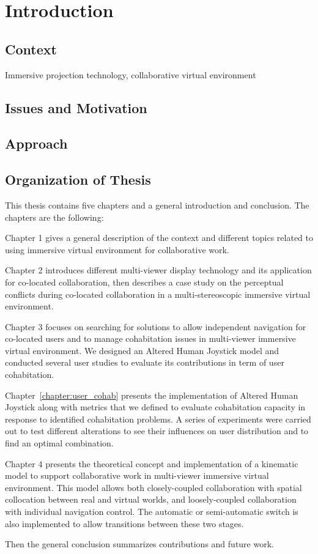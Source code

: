 \chapter*{Introduction}
\mtcaddchapter[Introduction]

\section*{Context}
Immersive projection technology, collaborative virtual environment

\section*{Issues and Motivation}

\section*{Approach}

\section*{Organization of Thesis}
This thesis contains five chapters and a general introduction and conclusion. The chapters are the following:

Chapter 1 gives a general description of the context and different topics related to using immersive virtual environment for collaborative work.

Chapter 2 introduces different multi-viewer display technology and its application for co-located collaboration, then describes a case study on the perceptual conflicts during co-located collaboration in a multi-stereoscopic immersive virtual environment.

Chapter 3 focuses on searching for solutions to allow independent navigation for co-located users and to manage cohabitation issues in multi-viewer immersive virtual environment. We designed an Altered Human Joystick model and conducted several user studies to evaluate its contributions in term of user cohabitation.

Chapter~\ref{chapter:user_cohab} presents the implementation of Altered Human Joystick along with metrics that we defined to evaluate cohabitation capacity in response to identified cohabitation problems. A series of experiments were carried out to test different alterations to see their influences on user distribution and to find an optimal combination.

Chapter 4 presents the theoretical concept and implementation of a kinematic model to support collaborative work in multi-viewer immersive virtual environment. This model allows both closely-coupled collaboration with spatial collocation between real and virtual worlds, and loosely-coupled collaboration with individual navigation control. The automatic or semi-automatic switch is also implemented to allow transitions between these two stages.

Then the general conclusion summarizes contributions and future work.